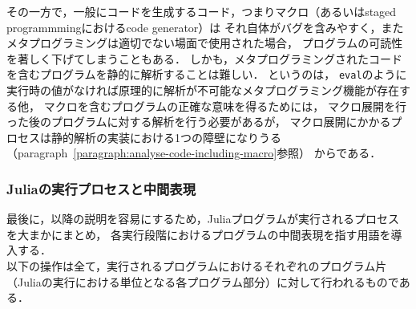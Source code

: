 その一方で，一般にコードを生成するコード，つまりマクロ（あるいはstaged programmmingにおけるcode generator）は
それ自体がバグを含みやすく，またメタプログラミングは適切でない場面で使用された場合，
プログラムの可読性を著しく下げてしまうこともある．
しかも，メタプログラミングされたコードを含むプログラムを静的に解析することは難しい．
というのは，
\verb|eval|のように実行時の値がなければ原理的に解析が不可能なメタプログラミング機能が存在する他，
マクロを含むプログラムの正確な意味を得るためには，
マクロ展開を行った後のプログラムに対する解析を行う必要があるが，
マクロ展開にかかるプロセスは静的解析の実装における1つの障壁になりうる
（paragraph~\ref{paragraph:analyse-code-including-macro}参照）
からである．

\subsubsection*{Juliaの実行プロセスと中間表現} \label{subsubsection:eval-process}

最後に，以降の説明を容易にするため，Juliaプログラムが実行されるプロセスを大まかにまとめ，
各実行段階におけるプログラムの中間表現を指す用語を導入する\cite{eval-of-julia-code, julia-asts}．\\

以下の操作は全て，実行されるプログラムにおけるそれぞれのプログラム片
（Juliaの実行における単位となる各プログラム部分）に対して行われるものである．

